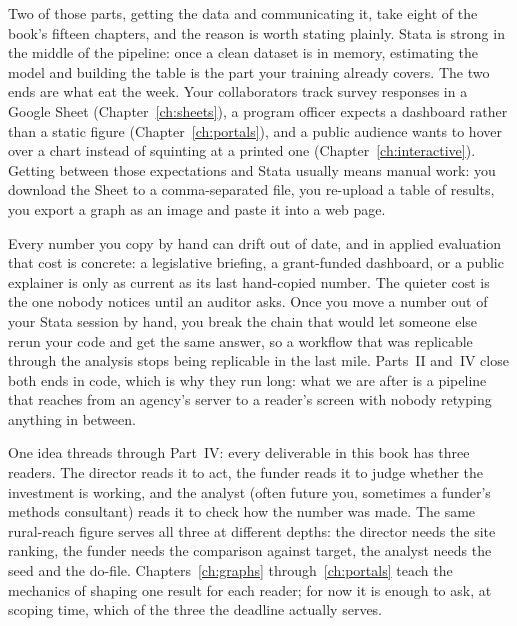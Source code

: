 \documentclass[
    a4paper,
    fontsize=10pt,
    twoside=true,
    numbers=noenddot,
]{kaobook}
\begin{document}
Two of those parts, getting the data and communicating it, take eight of the book's fifteen chapters, and the reason is worth stating plainly. Stata is strong in the middle of the pipeline: once a clean dataset is in memory, estimating the model and building the table is the part your training already covers. The two ends are what eat the week. Your collaborators track survey responses in a Google Sheet (Chapter~\ref{ch:sheets}), a program officer expects a dashboard rather than a static figure (Chapter~\ref{ch:portals}), and a public audience wants to hover over a chart instead of squinting at a printed one (Chapter~\ref{ch:interactive}). Getting between those expectations and Stata usually means manual work: you download the Sheet to a comma-separated file, you re-upload a table of results, you export a graph as an image and paste it into a web page.

Every number you copy by hand can drift out of date, and in applied evaluation that cost is concrete: a legislative briefing, a grant-funded dashboard, or a public explainer is only as current as its last hand-copied number. The quieter cost is the one nobody notices until an auditor asks. Once you move a number out of your Stata session by hand, you break the chain that would let someone else rerun your code and get the same answer, so a workflow that was replicable through the analysis stops being replicable in the last mile. Parts~II and~IV close both ends in code, which is why they run long: what we are after is a pipeline that reaches from an agency's server to a reader's screen with nobody retyping anything in between.

One idea threads through Part~IV: every deliverable in this book has three readers. The director reads it to act, the funder reads it to judge whether the investment is working, and the analyst (often future you, sometimes a funder's methods consultant) reads it to check how the number was made. The same rural-reach figure serves all three at different depths: the director needs the site ranking, the funder needs the comparison against target, the analyst needs the seed and the do-file. Chapters~\ref{ch:graphs} through~\ref{ch:portals} teach the mechanics of shaping one result for each reader; for now it is enough to ask, at scoping time, which of the three the deadline actually serves.
\end{document}
